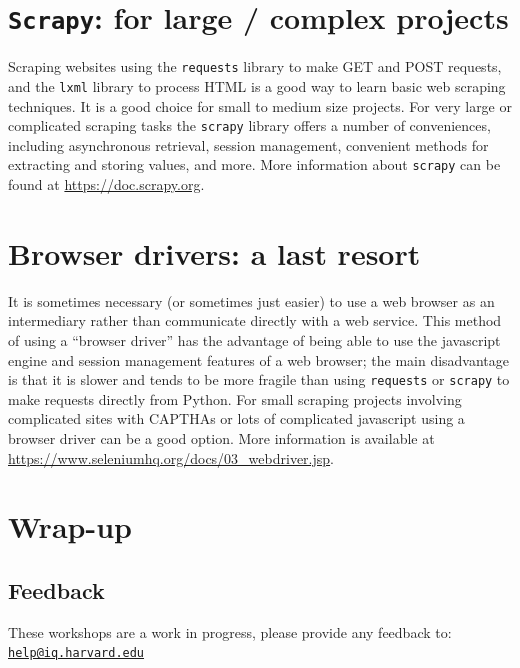 \documentclass[
]{book}
\begin{document}
\hypertarget{scrapy-for-large-complex-projects}{%
\section{\texorpdfstring{\texttt{Scrapy}: for large / complex projects}{Scrapy: for large / complex projects}}\label{scrapy-for-large-complex-projects}}

Scraping websites using the \texttt{requests} library to make GET and POST requests, and the \texttt{lxml} library to process HTML is a good way to learn basic web scraping techniques. It is a good choice for small to medium size projects. For very large or complicated scraping tasks the \texttt{scrapy} library offers a number of conveniences, including asynchronous retrieval, session management, convenient methods for extracting and storing values, and more. More information about \texttt{scrapy} can be found at \url{https://doc.scrapy.org}.

\hypertarget{browser-drivers-a-last-resort}{%
\section{Browser drivers: a last resort}\label{browser-drivers-a-last-resort}}

It is sometimes necessary (or sometimes just easier) to use a web browser as an intermediary rather than communicate directly with a web service. This method of using a ``browser driver'' has the advantage of being able to use the javascript engine and session management features of a web browser; the main disadvantage is that it is slower and tends to be more fragile than using \texttt{requests} or \texttt{scrapy} to make requests directly from Python. For small scraping projects involving complicated sites with CAPTHAs or lots of complicated javascript using a browser driver can be a good option. More information is available at \url{https://www.seleniumhq.org/docs/03_webdriver.jsp}.

\hypertarget{wrap-up-6}{%
\section{Wrap-up}\label{wrap-up-6}}

\hypertarget{feedback-6}{%
\subsection{Feedback}\label{feedback-6}}

These workshops are a work in progress, please provide any feedback to: \href{mailto:help@iq.harvard.edu}{\nolinkurl{help@iq.harvard.edu}}
\end{document}
